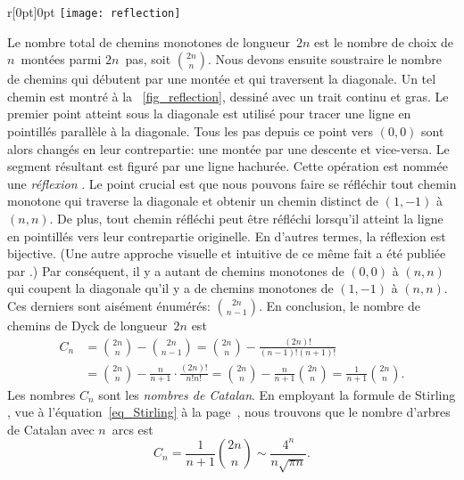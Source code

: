 \begin{wrapfigure}[14]{r}[0pt]{0pt}
\centering
\texttt{[image: reflection]}
\caption{Réflexion d'un préfixe par rapport à \(y = x - 1\)
\label{fig_reflection}}
\end{wrapfigure}
Le nombre total de chemins monotones de longueur~\(2n\) est le nombre
de choix de \(n\)~montées parmi \(2n\)~pas, soit
\(\binom{2n}{n}\). Nous devons ensuite soustraire le nombre de chemins
qui débutent par une montée et qui traversent la diagonale. Un tel
chemin est montré à la \fig~\ref{fig_reflection}, dessiné avec un
trait continu et gras. Le premier point atteint sous la diagonale est
utilisé pour tracer une ligne en pointillés parallèle à la
diagonale. Tous les pas depuis ce point vers \((0,0)\) sont alors
changés en leur contrepartie: une montée par une descente et
vice-versa. Le segment résultant est figuré par une ligne
hachurée. Cette opération est nommée une \emph{réflexion}
\citep{Renault_2008}. Le point crucial est que nous pouvons faire se
réfléchir tout chemin monotone qui traverse la diagonale et obtenir un
chemin distinct de \((1,-1)\) à \((n,n)\). De plus, tout chemin
réfléchi peut être réfléchi lorsqu'il atteint la ligne en pointillés
vers leur contrepartie originelle. En d'autres termes, la réflexion
est bijective. (Une autre approche visuelle et intuitive de ce même
fait a été publiée par \cite{Callan_1995}.) Par conséquent, il y a
autant de chemins monotones de \((0,0)\) à \((n,n)\) qui coupent la
diagonale qu'il y a de chemins monotones de \((1,-1)\) à \((n,n)\). Ces derniers sont aisément énumérés: \(\binom{2n}{n-1}\). En conclusion, le nombre de chemins de Dyck de longueur~\(2n\) 
est\label{eq_Ann}
\begin{align*}
C_n &= \binom{2n}{n} - \binom{2n}{n-1}
= \binom{2n}{n} - \frac{(2n)!}{(n-1)!(n+1)!}\\
&= \binom{2n}{n} - \frac{n}{n+1} \cdot \frac{(2n)!}{n!n!}
 = \binom{2n}{n} - \frac{n}{n+1} \binom{2n}{n} = \frac{1}{n+1}\binom{2n}{n}.
\end{align*}
Les nombres \(C_n\) sont les \emph{nombres de Catalan}.
En employant la formule de Stirling , vue à
l'équation~\eqref{eq_Stirling} à la page~\pageref{eq_Stirling}, nous trouvons que le nombre d'arbres de Catalan avec \(n\)~arcs est
\begin{equation}
  C_n = \frac{1}{n+1}\binom{2n}{n} \sim \frac{4^n}{n\sqrt{\pi n}}.
\label{eq_Cn}
\end{equation}

